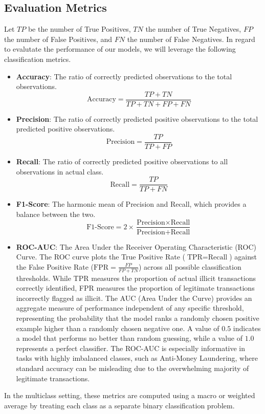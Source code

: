 \subsection{Evaluation Metrics}\label{subsec:eval_metrics}
 Let \(TP\) be the number of True Positives, \(TN\) the number of True Negatives, \(FP\) the number of False Positives, and \(FN\) the number of False Negatives.
In regard to evalutate the performance of our models, we will leverage the following classification metrics.
\begin{itemize}
    \item \textbf{Accuracy}: The ratio of correctly predicted observations to the total observations.
    \begin{equation}
        \text{Accuracy} = \frac{TP + TN}{TP + TN + FP + FN}
    \end{equation}
    \item \textbf{Precision}: The ratio of correctly predicted positive observations to the total predicted positive observations.
    \begin{equation}
        \text{Precision} = \frac{TP}{TP + FP}
    \end{equation}
    \item \textbf{Recall}: The ratio of correctly predicted positive observations to all observations in actual class.
    \begin{equation}
        \text{Recall} = \frac{TP}{TP + FN}
    \end{equation}
    \item \textbf{F1-Score}: The harmonic mean of Precision and Recall, which provides a balance between the two.
    \begin{equation}
        \text{F1-Score} = 2 \times \frac{\text{Precision} \times \text{Recall}}{\text{Precision} + \text{Recall}}
    \end{equation}
    \item \textbf{ROC-AUC}: The Area Under the Receiver Operating Characteristic (ROC) Curve. The ROC curve plots the True Positive Rate (\(\text{TPR} = \text{Recall}\)) against the False Positive Rate (\(\text{FPR} = \frac{FP}{FP + TN}\)) across all possible classification thresholds. While TPR measures the proportion of actual illicit transactions correctly identified, FPR measures the proportion of legitimate transactions incorrectly flagged as illicit. The AUC (Area Under the Curve) provides an aggregate measure of performance independent of any specific threshold, representing the probability that the model ranks a randomly chosen positive example higher than a randomly chosen negative one. A value of \(0.5\) indicates a model that performs no better than random guessing, while a value of \(1.0\) represents a perfect classifier. The ROC-AUC is especially informative in tasks with highly imbalanced classes, such as Anti-Money Laundering, where standard accuracy can be misleading due to the overwhelming majority of legitimate transactions.
\end{itemize}
In the multiclass setting, these metrics are computed using a macro or weighted average by treating each class as a separate binary classification problem.

